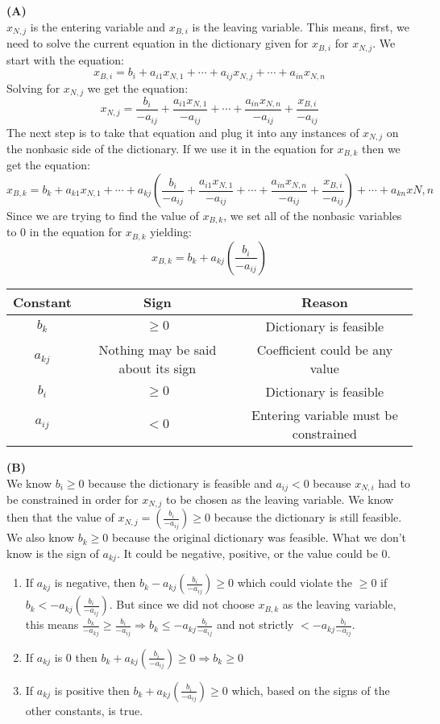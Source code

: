 \documentclass[11pt]{article}
\begin{document}
\noindent \textbf{(A)}
\\
$x_{N,j}$ is the entering variable and $x_{B,i}$ is the leaving variable.  This means, first, we need to solve the current equation in the dictionary given for $x_{B,i}$ for $x_{N,j}$.  We start with the equation:
$$
x_{B,i} = b_i + a_{i1}x_{N,1} + \cdots + a_{ij}x_{N,j} + \cdots + a_{in}x_{N,n}
$$
Solving for $x_{N,j}$ we get the equation:
$$
x_{N,j} = \frac{b_i}{-a_{ij}} + \frac{a_{i1}x_{N,1}}{-a_{ij}} + \cdots + \frac{a_{in}x_{N,n}}{-a_{ij}} + \frac{x_{B,i}}{-a_{ij}}
$$
The next step is to take that equation and plug it into any instances of $x_{N,j}$ on the nonbasic side of the dictionary.  If we use it in the equation for $x_{B,k}$ then we get the equation:
$$
x_{B,k} = b_k + a_{k1}x_{N,1} + \cdots + a_{kj}(\frac{b_i}{-a_{ij}} + \frac{a_{i1}x_{N,1}}{-a_{ij}} + \cdots + \frac{a_{in}x_{N,n}}{-a_{ij}} + \frac{x_{B,i}}{-a_{ij}}) + \cdots + a_{kn}x{N,n}
$$
Since we are trying to find the value of $x_{B,k}$, we set all of the nonbasic variables to 0 in the equation for $x_{B,k}$ yielding:
$$
x_{B,k} = b_k + a_{kj}(\frac{b_i}{-a_{ij}})
$$
\begin{tabular}{|c|c|c|}
\hline
Constant & Sign & Reason\\ \hline
$b_k$ & $\ge 0$ & Dictionary is feasible\\ \hline
$a_{kj}$ & Nothing may be said about its sign & Coefficient could be any value\\  \hline
$b_i$ & $\ge 0$ & Dictionary is feasible\\ \hline
$a_{ij}$ & $< 0$ & Entering variable must be constrained\\ \hline
\end{tabular}

\medskip

\noindent \textbf{(B)}
\\
We know $b_i \ge 0$ because the dictionary is feasible and $a_{ij} < 0$ because $x_{N,i}$ had to be constrained in order for $x_{N,j}$ to be chosen as the leaving variable.  We know then that the value of $x_{N,j} = (\frac{b_i}{-a_{ij}}) \ge 0$ because the dictionary is still feasible.  We also know $b_k \ge 0$ because the original dictionary was feasible.  What we don't know is the sign of $a_{kj}$.  It could be negative, positive, or the value could be 0.
\begin{enumerate}
\item If $a_{kj}$ is negative, then 
$
b_k - a_{kj} \left(\frac{b_i}{ - a_{ij}}\right)  \geq 0
$
which could violate the $\ge 0$ if $b_k < -a_{kj} \left(\frac{b_i}{ - a_{ij}}\right)$.  But since we did not choose $x_{B,k}$ as the leaving variable, this means 
$\frac{b_k}{-a_{kj}} \ge \frac{b_i}{-a_{ij}} \Rightarrow b_k \le -a_{kj}\frac{b_i}{-a_{ij}}$ and not strictly $ < -a_{kj}\frac{b_i}{-a_{ij}}$.

\item If $a_{kj}$ is 0 then 
$
b_k + a_{kj} \left(\frac{b_i}{ - a_{ij}}\right)  \geq 0 \Rightarrow
b_k \geq 0
$

\item If $a_{kj}$ is positive then
$
b_k + a_{kj} \left(\frac{b_i}{ - a_{ij}}\right)  \geq 0
$
which, based on the signs of the other constants, is true.
\end{enumerate}
\end{document}
